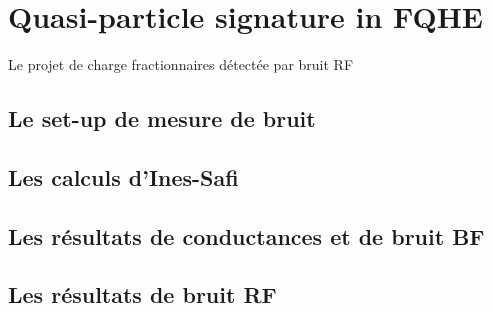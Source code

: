 \chapter{Quasi-particle signature in FQHE}

Le projet de charge fractionnaires détectée par bruit RF

\section{\texorpdfstring{Le set-up de mesure de bruit}{}}

\section{\texorpdfstring{Les calculs d'Ines-Safi}{}}

\section{\texorpdfstring{Les résultats de conductances et de bruit BF}{}}

\section{\texorpdfstring{Les résultats de bruit RF}{}}